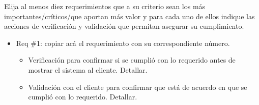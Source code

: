 
	Elija al menos diez requerimientos que a su criterio sean los más importantes/críticos/que aportan más valor y para cada uno de ellos indique las acciones de verificación y validación que permitan asegurar su cumplimiento.

	\begin{itemize}
		\item Req \#1: copiar acá el requerimiento con su correspondiente número.

		      \begin{itemize}
			      \item Verificación para confirmar si se cumplió con lo requerido antes de mostrar el
			            sistema al cliente. Detallar.
			      \item Validación con el cliente para confirmar que está de acuerdo en que se cumplió
			            con lo requerido. Detallar.
		      \end{itemize}

	\end{itemize}

